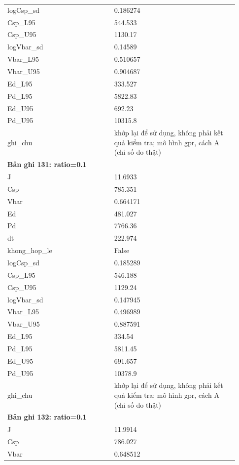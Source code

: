 \begin{longtable}{p{0.43\linewidth}p{0.50\linewidth}}
logCsp\_\allowbreak sd & 0.186274 \\
Csp\_\allowbreak L95 & 544.533 \\
Csp\_\allowbreak U95 & 1130.17 \\
logVbar\_\allowbreak sd & 0.14589 \\
Vbar\_\allowbreak L95 & 0.510657 \\
Vbar\_\allowbreak U95 & 0.904687 \\
Ed\_\allowbreak L95 & 333.527 \\
Pd\_\allowbreak L95 & 5822.83 \\
Ed\_\allowbreak U95 & 692.23 \\
Pd\_\allowbreak U95 & 10315.8 \\
ghi\_\allowbreak chu & khớp lại để sử dụng, không phải kết quả kiểm tra; mô hình gpr, cách A (chỉ số đo thật) \\
\midrule
\multicolumn{2}{p{0.95\linewidth}}{\textbf{Bản ghi 131: ratio=0.1}} \\
J & 11.6933 \\
Csp & 785.351 \\
Vbar & 0.664171 \\
Ed & 481.027 \\
Pd & 7766.36 \\
dt & 222.974 \\
khong\_\allowbreak hop\_\allowbreak le & False \\
logCsp\_\allowbreak sd & 0.185289 \\
Csp\_\allowbreak L95 & 546.188 \\
Csp\_\allowbreak U95 & 1129.24 \\
logVbar\_\allowbreak sd & 0.147945 \\
Vbar\_\allowbreak L95 & 0.496989 \\
Vbar\_\allowbreak U95 & 0.887591 \\
Ed\_\allowbreak L95 & 334.54 \\
Pd\_\allowbreak L95 & 5811.45 \\
Ed\_\allowbreak U95 & 691.657 \\
Pd\_\allowbreak U95 & 10378.9 \\
ghi\_\allowbreak chu & khớp lại để sử dụng, không phải kết quả kiểm tra; mô hình gpr, cách A (chỉ số đo thật) \\
\midrule
\multicolumn{2}{p{0.95\linewidth}}{\textbf{Bản ghi 132: ratio=0.1}} \\
J & 11.9914 \\
Csp & 786.027 \\
Vbar & 0.648512 \\

\end{longtable}
